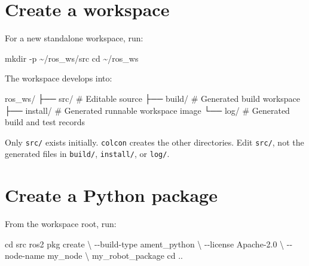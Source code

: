 \documentclass[
  australian,
  12pt,
  letterpaper,
  DIV=11,
  numbers=noendperiod,
  twoside]{scrreprt}
\newenvironment{Shaded}{\begin{snugshade}}{\end{snugshade}}
\newcommand{\AttributeTok}[1]{\textcolor[rgb]{0.40,0.45,0.13}{#1}}
\newcommand{\BuiltInTok}[1]{\textcolor[rgb]{0.00,0.23,0.31}{#1}}
\newcommand{\DataTypeTok}[1]{\textcolor[rgb]{0.68,0.00,0.00}{#1}}
\newcommand{\ExtensionTok}[1]{\textcolor[rgb]{0.00,0.23,0.31}{#1}}
\newcommand{\FunctionTok}[1]{\textcolor[rgb]{0.28,0.35,0.67}{#1}}
\newcommand{\NormalTok}[1]{\textcolor[rgb]{0.00,0.23,0.31}{#1}}
\begin{document}
\section{Create a workspace}\label{create-a-workspace}

For a new standalone workspace, run:

\begin{Shaded}
\begin{Highlighting}[]
\FunctionTok{mkdir} \AttributeTok{{-}p}\NormalTok{ \textasciitilde{}/ros\_ws/src}
\BuiltInTok{cd}\NormalTok{ \textasciitilde{}/ros\_ws}
\end{Highlighting}
\end{Shaded}

The workspace develops into:

\begin{Shaded}
\begin{Highlighting}[]
\NormalTok{ros\_ws/}
\NormalTok{├── src/       \# Editable source}
\NormalTok{├── build/     \# Generated build workspace}
\NormalTok{├── install/   \# Generated runnable workspace image}
\NormalTok{└── log/       \# Generated build and test records}
\end{Highlighting}
\end{Shaded}

Only \texttt{src/} exists initially. \texttt{colcon} creates the other
directories. Edit \texttt{src/}, not the generated files in
\texttt{build/}, \texttt{install/}, or \texttt{log/}.

\section{Create a Python package}\label{create-a-python-package}

From the workspace root, run:

\begin{Shaded}
\begin{Highlighting}[]
\BuiltInTok{cd}\NormalTok{ src}
\ExtensionTok{ros2}\NormalTok{ pkg create }\DataTypeTok{\textbackslash{}}
  \AttributeTok{{-}{-}build{-}type}\NormalTok{ ament\_python }\DataTypeTok{\textbackslash{}}
  \AttributeTok{{-}{-}license}\NormalTok{ Apache{-}2.0 }\DataTypeTok{\textbackslash{}}
  \AttributeTok{{-}{-}node{-}name}\NormalTok{ my\_node }\DataTypeTok{\textbackslash{}}
\NormalTok{  my\_robot\_package}
\BuiltInTok{cd}\NormalTok{ ..}
\end{Highlighting}
\end{Shaded}
\end{document}
